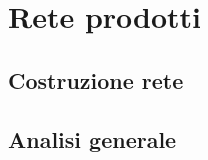 \section{Rete prodotti}\label{ReteProdotti}



\subsection{Costruzione rete}

\subsection{Analisi generale}





    

